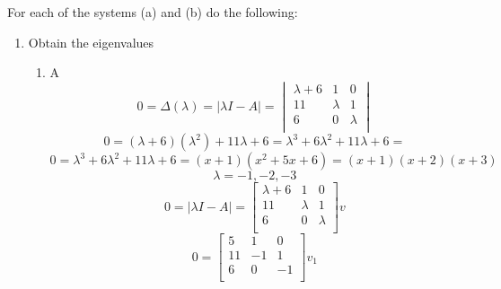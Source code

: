 \item For each of the systems (a) and (b) do the following:
  \begin{enumerate}
  \item Obtain the eigenvalues \\
    \begin{enumerate}
    \item A\\
      \begin{equation}
        0 =
        \Delta(\lambda) =
        \vert \lambda I - A\vert =
        \begin{vmatrix}
          \lambda + 6 & 1 & 0 \\
          11 & \lambda & 1 \\
          6 & 0 & \lambda \\
        \end{vmatrix}
      \end{equation}
      \begin{equation}
        0 =
        (\lambda + 6)(\lambda^2) + 11\lambda + 6 =
        \lambda^3 + 6\lambda^2 + 11\lambda + 6 =
      \end{equation}
      \begin{equation}
        0 =
        \lambda^3 + 6\lambda^2 + 11\lambda + 6 =
        (x + 1)(x^2 + 5x + 6) = 
        (x + 1)(x + 2)(x + 3)
      \end{equation}
      \begin{equation}
        \lambda = -1, -2, -3
      \end{equation}
      \begin{equation}
        0 =
        \vert \lambda I - A\vert =
        \begin{bmatrix}
          \lambda + 6 & 1 & 0 \\
          11 & \lambda & 1 \\
          6 & 0 & \lambda \\
        \end{bmatrix}v
      \end{equation}
      \begin{equation}
        0 = 
        \begin{bmatrix}
          5 & 1 & 0 \\
          11 & -1 & 1 \\
          6 & 0 & -1 \\
        \end{bmatrix}v_1
      \end{equation}
      \begin{equation}

\end{equation}
\end{enumerate}
\end{enumerate}
